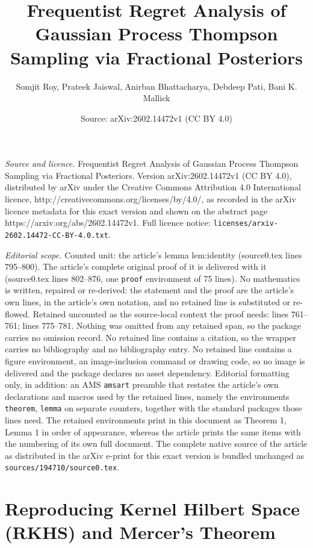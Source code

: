 \documentclass[10pt,a4paper]{amsart}
\title{Frequentist Regret Analysis of Gaussian Process Thompson Sampling via Fractional Posteriors}
\author{Somjit Roy, Prateek Jaiswal, Anirban Bhattacharya, Debdeep Pati, Bani K. Mallick}
\date{Source: arXiv:2602.14472v1 (CC BY 4.0)}
\begin{document}
\maketitle

\noindent\emph{Source and licence.} Frequentist Regret Analysis of Gaussian Process Thompson Sampling via Fractional Posteriors. Version arXiv:2602.14472v1 (CC BY 4.0), distributed by arXiv under the Creative Commons Attribution 4.0 International licence, http://creativecommons.org/licenses/by/4.0/, as recorded in the arXiv licence metadata for this exact version and shown on the abstract page https://arxiv.org/abs/2602.14472v1. Full licence notice: \texttt{licenses/arxiv-2602.14472-CC-BY-4.0.txt}.\par\smallskip

\noindent\textit{Editorial scope.} Counted unit: the article's lemma lem:identity (source0.tex lines 795--800). The article's complete original proof of it is delivered with it (source0.tex lines 802--876, one \texttt{proof} environment of 75 lines). No mathematics is written, repaired or re-derived: the statement and the proof are the article's own lines, in the article's own notation, and no retained line is substituted or re-flowed.  Retained uncounted as the source-local context the proof needs: lines 761--761; lines 775--781.  Nothing was omitted from any retained span, so the package carries no omission record.  No retained line contains a citation, so the wrapper carries no bibliography and no bibliography entry.  No retained line contains a figure environment, an image-inclusion command or drawing code, so no image is delivered and the package declares no asset dependency.  Editorial formatting only, in addition: an AMS \texttt{amsart} preamble that restates the article's own declarations and macros used by the retained lines, namely the environments \texttt{theorem}, \texttt{lemma} on separate counters, together with the standard packages those lines need.  The retained environments print in this document as Theorem 1, Lemma 1 in order of appearance, whereas the article prints the same items with the numbering of its own full document.  The complete native source of the article as distributed in the arXiv e-print for this exact version is bundled unchanged as \texttt{sources/194710/source0.tex}.
\section{Reproducing Kernel Hilbert Space (RKHS) and Mercer's Theorem}\label{app:RKHS-Mercer}
\end{document}

